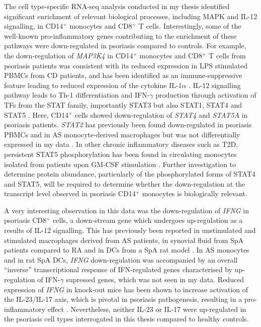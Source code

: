 The cell type-specific RNA-seq analysis conducted in my thesis identified significant enrichment of relevant biological processes, including MAPK and IL-12 signalling, in CD14$^+$ monocytes and CD8$^+$ T cells. Interestingly, some of the well-known pro-inflammatory genes contributing to the enrichment of these pathways were down-regulated in psoriasis compared to controls. For example, the down-regulation of \textit{MAP3K4} in CD14$^+$ monocytes and CD8$^+$ T cells from psoriasis patients was consistent with its reduced expression in LPS stimulated PBMCs from CD patients, and has been identified as an immune-suppressive feature leading to reduced expression of the cytokine IL-1$\alpha$  \parencite{Kraan2012}. IL-12 signalling pathway leads to Th-1 differentiation and IFN-$\gamma$ production through activation of TFs from the STAT family, importantly STAT3 but also STAT1, STAT4 and STAT5 \parencite{Kusaba2005}. Here, CD14$^+$ cells showed down-regulation of \textit{STAT4} and \textit{STAT5A} in psoriasis patients. \textit{STAT2} has previously been found down-regulated in psoriasis PBMCs and in AS monocyte-derived macrophages but was not differentially expressed in my data \parencite{Coda2012,Smith2008}. In other chronic inflammatory diseases such as T2D, persistent STAT5 phosphorylation has been found in circulating monocytes isolated from patients upon GM-CSF stimulation \parencite{Litherland2005}. Further investigation to determine protein abundance, particularly of the phosphorylated forms of STAT4 and STAT5, will be required to determine whether the down-regulation at the transcript level observed in psoriasis CD14$^+$ monocytes is biologically relevant. 

A very interesting observation in this data was the down-regulation of \textit{IFNG} in psoriasis CD8$^+$ cells, a  down-stream gene which undergoes up-regulation as a results of IL-12 signalling. This has previously been reported in unstimulated and stimulated macrophages derived from AS patients, in synovial fluid from SpA patients compared to RA and in DCs from a SpA rat model \parencite{Smith2008,Fert2014, }. In AS monocytes and in rat SpA DCs, \textit{IFNG} down-regulation was accompanied by an overall “inverse” transcriptional response of IFN-regulated genes characterised by up-regulation of IFN-$\gamma$ supressed genes, which was not seen in my data. Reduced expression of \textit{IFNG} in knock-out mice has been shown to increase activation of the IL-23/IL-17 axis, which is pivotal in psoriasis pathogenesis, resulting in a pro-inflammatory effect  \parencite{Canete2000,Chu2007}. Nevertheless, neither IL-23 or IL-17 were up-regulated in the psoriasis cell types interrogated in this thesis compared to healthy controls.


